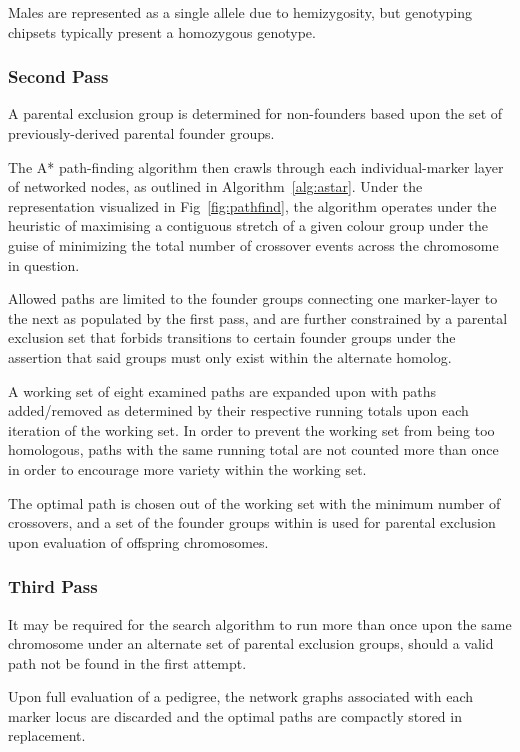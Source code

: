 Males are represented as a single allele due to hemizygosity, but genotyping chipsets typically present a homozygous genotype.

\subsubsection{Second Pass}

A parental exclusion group is determined for non-founders based upon the set of previously-derived parental founder groups.

The A* path-finding algorithm then crawls through each individual-marker layer of networked nodes, as outlined in Algorithm~\ref{alg:astar}. Under the representation visualized in Fig~\ref{fig:pathfind}, the algorithm operates under the heuristic of maximising a contiguous stretch of a given colour group under the guise of minimizing the total number of crossover events across the chromosome in question.




Allowed paths are limited to the founder groups connecting one marker-layer to the next as populated by the first pass, and are further constrained by a parental exclusion set that forbids transitions to certain founder groups under the assertion that said groups must only exist within the alternate homolog.

A working set of eight examined paths are expanded upon with paths added/removed as determined by their respective running totals upon each iteration of the working set. In order to prevent the working set from being too homologous, paths with the same running total are not counted more than once in order to encourage more variety within the working set. 

The optimal path is chosen out of the working set with the minimum number of crossovers, and a set of the founder groups within is used for parental exclusion upon evaluation of offspring chromosomes. 

\subsubsection{Third Pass}

It may be required for the search algorithm to run more than once upon the same chromosome under an alternate set of parental exclusion groups, should a valid path not be found in the first attempt.

Upon full evaluation of a pedigree, the network graphs associated with each marker locus are discarded and the optimal paths are compactly stored in replacement.